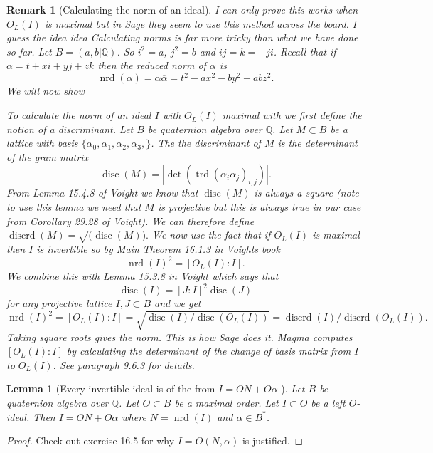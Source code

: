 \documentclass[10pt]{article}
\theoremstyle{plain}
\newtheorem{lemma}[theorem]{Lemma}
\newtheorem{remark}[theorem]{Remark}
\theoremstyle{definition}
\newcommand{\op}{\operatorname}
\newcommand{\Q}{\mathbb{Q}}
\newcommand{\nrd}{\op{nrd}}
\newcommand{\trd}{\op{trd}}
\newcommand{\disc}{\op{disc}}
\begin{document}
\begin{remark}[Calculating the norm of an ideal]
    {\color{red} I can only prove this works when \( O_L(I) \) is maximal but in Sage they seem to use this method across the board. I guess the idea idea }
    Calculating norms is far more tricky than what we have done so far.
    Let \( B = (a, b | \Q )\).
    So \( i^2 = a \), \( j^2 = b \) and \( ij = k = -ji \).
    Recall that if \( \alpha = t + xi + yj + zk \) then the reduced norm of \( \alpha \) is
    \[
        \nrd(\alpha) = \alpha \overline{\alpha} = t^2 - ax^2 - by^2 + abz^2.
    \]
    We will now show


    To calculate the norm of an ideal \( I \) with \( O_L(I) \) maximal with  we first define the notion of a \emph{discriminant}.
    Let \( B \) be quaternion algebra over \( \Q \).
    Let \( M \subset B \) be a lattice with basis \( \{\alpha_0, \alpha_1, \alpha_2, \alpha_3,\} \).
    The the discriminant of \( M \) is the determinant of the gram matrix
    \[
        \disc(M) = |\det(\trd(\alpha_i \alpha_j)_{i, j})|.
    \]
    From Lemma 15.4.8 of Voight we know that \( \disc(M) \) is always a square (note to use this lemma we need that \( M \) is projective but this is always true in our case from Corollary 29.28 of Voight).
    We can therefore define \( \op{discrd}(M) = \sqrt(\disc(M)). \)
    We now use the fact that if \( O_L(I) \) is maximal then \( I \) is invertible so by Main Theorem 16.1.3 in Voights book
    \[
        \nrd(I)^2 = [O_L(I) : I].
    \]
    We combine this with Lemma 15.3.8 in Voight which says that
    \[
        \disc(I) = [J : I]^2\disc(J)
    \]
    for any projective lattice \( I, J \subset B \) and we get
    \[
        \nrd(I)^2
        = [O_L(I) : I]
        = \sqrt{\disc(I) / \disc(O_L(I))}
        = \op{discrd}(I) / \op{discrd}(O_L(I)).
    \]
    Taking square roots gives the norm.
    This is how Sage does it.
    Magma computes \( [O_L(I) : I] \) by calculating the determinant of the change of basis matrix from \( I \) to \( O_L(I) \).
    See paragraph 9.6.3 for details.
\end{remark}

\begin{lemma}[Every invertible ideal is of the from \( I = ON + O\alpha \) ]
    Let \( B \) be quaternion algebra over \( \Q \).
    Let \( O \subset B \) be a maximal order.
    Let \( I \subset O \) be a left \( O \)-ideal.
    Then \( I = ON + O \alpha \) where \( N = \nrd(I) \) and \( \alpha \in B^* \).
\end{lemma}
\begin{proof}
    {\color{red} Check out exercise 16.5 for why \( I = O(N, \alpha) \) is justified.}
\end{proof}
\end{document}
